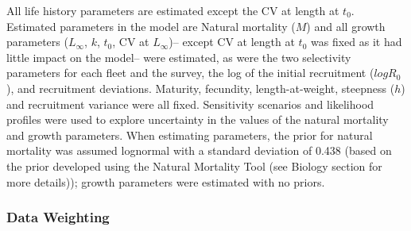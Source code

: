 \documentclass[11pt,
  english,
  a4paper,
]{article}
\begin{document}
\leavevmode\tagmcend\tagstructend


All life history parameters are estimated except the CV at length at {\(t_0\)\leavevmode\tagmcend\tagstructend}. Estimated parameters in the model are Natural mortality ({\(M\)\leavevmode\tagmcend\tagstructend}) and all growth parameters ({\(L_{\infty}\)\leavevmode\tagmcend\tagstructend}, {\(k\)\leavevmode\tagmcend\tagstructend}, {\(t_0\)\leavevmode\tagmcend\tagstructend}, CV at {\(L_{\infty}\)\leavevmode\tagmcend\tagstructend})-- except CV at length at {\(t_0\)\leavevmode\tagmcend\tagstructend} was fixed as it had little impact on the model-- were estimated, as were the two selectivity parameters for each fleet and the survey, the log of the initial recruitment ({\(logR_0\)\leavevmode\tagmcend\tagstructend}), and recruitment deviations. Maturity, fecundity, length-at-weight, steepness ({\(h\)\leavevmode\tagmcend\tagstructend}) and recruitment variance were all fixed. Sensitivity scenarios and likelihood profiles were used to explore uncertainty in the values of the natural mortality and growth parameters. When estimating parameters, the prior for natural mortality was assumed lognormal with a standard deviation of 0.438 (based on the prior developed using the Natural Mortality Tool (see Biology section for more details)); growth parameters were estimated with no priors.

\leavevmode\tagmcend\tagstructend\par


\hypertarget{data-weighting}{%
\subsubsection{Data Weighting}\label{data-weighting}}

\leavevmode\tagmcend\tagstructend

\end{document}
